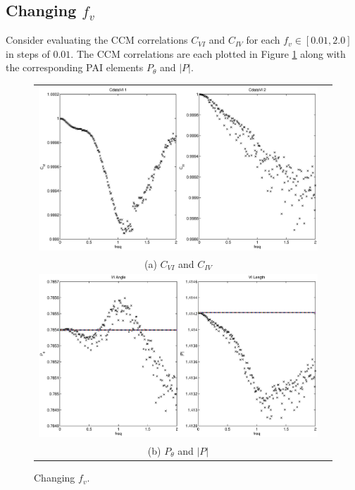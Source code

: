 \documentclass[a4paper,11pt]{article}
\begin{document}
\subsection{Changing $f_v$}
Consider evaluating the CCM correlations $C_{VI}$ and $C_{IV}$ for each $f_v\in[0.01,2.0]$ in steps of $0.01$.  The CCM correlations are each plotted in Figure \ref{fig:fv} along with the corresponding PAI elements $P_\theta$ and $|P|$.
\begin{figure}[H]
\begin{tabular}{cc}
\includegraphics[scale=0.5]{RLCircuitPlots/RLcirc_varyV_freq2.eps} \\
(a) $C_{VI}$ and $C_{IV}$ \\[6pt]
\includegraphics[scale=0.5]{RLCircuitPlots/RLcirc_varyV_freq.eps} \\
(b) $P_\theta$ and $|P|$ \\[6pt]
\end{tabular}
\caption{Changing $f_v$.}
\label{fig:fv}
\end{figure}
\end{document}
